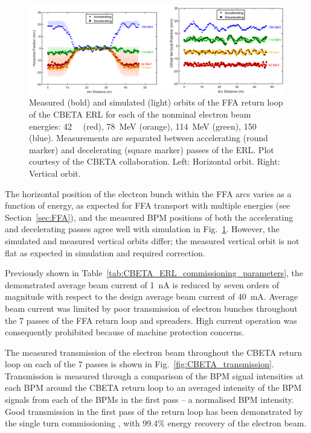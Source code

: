 \documentclass[../main.tex]{subfiles}
\begin{document}
\begin{figure}[!h]
\centering
\includegraphics[width=\textwidth]{Figures/CBETA_Multi-Pass_Commissioning/horizontal_vertical_orbit.pdf}
\caption{Measured (bold) and simulated (light) orbits of the FFA return loop of the CBETA ERL for each of the nonminal electron beam energies: 42~\si{\mega\electonvolt} (red), 78~\si{\mega\electronvolt} (orange), 114~\si{\mega\electronvolt} (green), 150~\si{\mega\electonvolt} (blue). Measurements are separated between accelerating (round marker) and decelerating (square marker) passes of the ERL. Plot courtesy of the CBETA collaboration. Left: Horizontal orbit. Right: Vertical orbit.}
\label{fig:CBETA_horizontal_vertical_orbit}
\end{figure}

The horizontal position of the electron bunch within the FFA arcs varies as a function of energy, as expected for FFA transport with multiple energies (see Section~\ref{sec:FFA}), and the measured BPM positions of both the accelerating and decelerating passes agree well with simulation in Fig.~\ref{fig:CBETA_horizontal_vertical_orbit}. However, the simulated and measured vertical orbits differ; the measured vertical orbit is not flat as expected in simulation and required correction.  

Previously shown in Table~\ref{tab:CBETA_ERL_commissioning_parameters}, the demonstrated average beam current of 1~\si{\nano\ampere} is reduced by seven orders of magnitude with respect to the design average beam current of 40~\si{\milli\ampere}. Average beam current was limited by poor transmission of electron bunches throughout the 7 passes of the FFA return loop and spreaders. High current operation was consequently prohibited because of machine protection concerns. 

The measured transmission of the electron beam throughout the CBETA return loop on each of the 7 passes is shown in Fig.~\ref{fig:CBETA_transmission}. Transmission is measured through a comparison of the BPM signal intensities at each BPM around the CBETA return loop to an averaged intensity of the BPM signals from each of the BPMs in the first pass -- a normalised BPM intensity. Good transmission in the first pass of the return loop has been demonstrated by the single turn commissioning \cite{gulliford2021measurement}, with 99.4\% energy recovery of the electron beam.       
\end{document}
